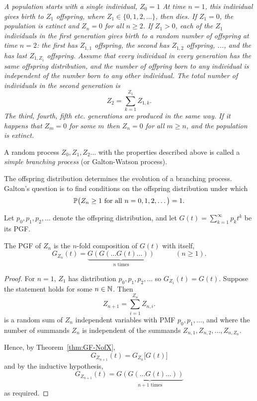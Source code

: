 \ben
\it A population starts with a single individual, $Z_0=1$
\it At time $n=1$, this individual gives birth to $Z_1$ offspring, where $Z_1\in\{0,1,2,\ldots\}$, then dies.
\it If $Z_1=0$, the population is extinct and $Z_n=0$ for all $n\geq 2$.
\it If $Z_1>0$, each of the $Z_1$ individuals in the first generation gives birth to a random number of offspring at time $n=2$: the first has $Z_{1,1}$ offspring, the second has $Z_{1,2}$ offspring, ..., and the has last $Z_{1,Z_1}$ offspring. 
\it Assume that every individual in every generation has the same offspring distribution, and the number of offpring born to any individual is independent of the number born to any other individual.
\it The total number of individuals in the second generation is
\[
Z_2 = \sum_{k=1}^{Z_1} Z_{1,k}.
\]
\it The third, fourth, fifth etc. generations are produced in the same way.
\it If it happens that $Z_m=0$ for some $m$ then $Z_n=0$ for all $m\geq n$, and the population is \emph{extinct}.
\een

\begin{definition}
A random process $Z_0,Z_1,Z_2\ldots$ with the properties described above is called a \emph{simple branching process} (or Galton-Watson process).
\end{definition}

The offspring distribution determines the evolution of a branching process. Galton's question is to find conditions on the offspring distribution under which
\[
\mathbb{P}\big(Z_n\geq 1 \text{ for all } n=0,1,2,\ldots\big) = 1.
\]

Let $p_0,p_1,p_2,\ldots$ denote the offspring distribution, and let $G(t)=\sum_{k=1}^{\infty}p_k t^k$ be its PGF.

\begin{theorem}
The PGF of $Z_n$ is the $n$-fold composition of $G(t)$ with itself,
\[
G_{Z_n}(t) = \underbrace{G(G(\ldots G(t)\ldots))}_{\text{$n$ times}} \quad\qquad (n\geq 1). 
\]
\begin{proof}
For $n=1$, $Z_1$ has distribution $p_0,p_1,p_2,\ldots$ so $G_{Z_1}(t) = G(t)$.
Suppose the statement holds for some $n\in\mathbb{N}$. Then
\[
Z_{n+1} = \sum_{i=1}^{Z_n} Z_{n,i}.
\]
is a random sum of $Z_n$ independent variables with PMF $p_0,p_1,\ldots$, and where the number of summands $Z_n$ is independent of the summands $Z_{n,1},Z_{n,2},\ldots,Z_{n,Z_n}$.

\bigskip
Hence, by Theorem~\ref{thm:GF-NofX},
\[
G_{Z_{n+1}}(t) = G_{Z_n}\big[G(t)\big]
\]
and by the inductive hypothesis, 
\[
G_{Z_{n+1}}(t) = \underbrace{G(G(\ldots G(t)\ldots))}_{\text{$n+1$ times}}
\]
as required.
\end{proof}
\end{theorem}

